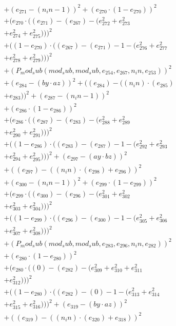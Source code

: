 \documentclass[10pt, a4paper]{article}
\begin{document}
\begin{align*}
& + (e_{271} - (n_in - 1))^{2} + (e_{270}  \cdot  (1 - e_{270}))^{2} \\
& + (e_{270}  \cdot  ((e_{271}) - (e_{267}) - (e_{272}^{2} + e_{273}^{2} \\
& + e_{274}^{2} + e_{275}^{2})))^{2} \\
& + ((1 - e_{270})  \cdot  ((e_{267}) - (e_{271}) - 1 - (e_{276}^{2} + e_{277}^{2} \\
& + e_{278}^{2} + e_{279}^{2})))^{2} \\
& + (P_mod_sub(mod_sub, mod_sub, e_{254}, e_{267}, n_in, e_{253}))^{2} \\
& + (e_{284} - (by  \cdot  az))^{2} + ((e_{284}) - ((n_in)  \cdot  (e_{285}) \\
& + e_{283}))^{2} + (e_{287} - (n_in - 1))^{2} \\
& + (e_{286}  \cdot  (1 - e_{286}))^{2} \\
& + (e_{286}  \cdot  ((e_{287}) - (e_{283}) - (e_{288}^{2} + e_{289}^{2} \\
& + e_{290}^{2} + e_{291}^{2})))^{2} \\
& + ((1 - e_{286})  \cdot  ((e_{283}) - (e_{287}) - 1 - (e_{292}^{2} + e_{293}^{2} \\
& + e_{294}^{2} + e_{295}^{2})))^{2} + (e_{297} - (ay  \cdot  bz))^{2} \\
& + ((e_{297}) - ((n_in)  \cdot  (e_{298}) + e_{296}))^{2} \\
& + (e_{300} - (n_in - 1))^{2} + (e_{299}  \cdot  (1 - e_{299}))^{2} \\
& + (e_{299}  \cdot  ((e_{300}) - (e_{296}) - (e_{301}^{2} + e_{302}^{2} \\
& + e_{303}^{2} + e_{304}^{2})))^{2} \\
& + ((1 - e_{299})  \cdot  ((e_{296}) - (e_{300}) - 1 - (e_{305}^{2} + e_{306}^{2} \\
& + e_{307}^{2} + e_{308}^{2})))^{2} \\
& + (P_mod_sub(mod_sub, mod_sub, e_{283}, e_{296}, n_in, e_{282}))^{2} \\
& + (e_{280}  \cdot  (1 - e_{280}))^{2} \\
& + (e_{280}  \cdot  ((0) - (e_{282}) - (e_{309}^{2} + e_{310}^{2} + e_{311}^{2} \\
& + e_{312}^{2})))^{2} \\
& + ((1 - e_{280})  \cdot  ((e_{282}) - (0) - 1 - (e_{313}^{2} + e_{314}^{2} \\
& + e_{315}^{2} + e_{316}^{2})))^{2} + (e_{319} - (by  \cdot  az))^{2} \\
& + ((e_{319}) - ((n_in)  \cdot  (e_{320}) + e_{318}))^{2} \\

\end{align*}
\end{document}
